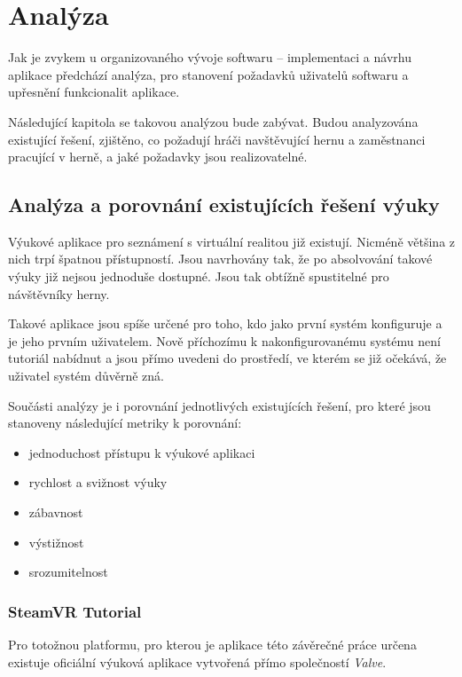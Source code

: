 \section{Analýza}\label{analuxfdza}

Jak je zvykem u organizovaného vývoje softwaru -- implementaci a návrhu
aplikace předchází analýza, pro stanovení požadavků uživatelů softwaru a
upřesnění funkcionalit aplikace.

Následující kapitola se takovou analýzou bude zabývat. Budou analyzována
existující řešení, zjištěno, co požadují hráči navštěvující hernu a
zaměstnanci pracující v herně, a jaké požadavky jsou realizovatelné.

\subsection{Analýza a porovnání existujících řešení
výuky}\label{analuxfdza-a-porovnuxe1nuxed-existujuxedcuxedch-ux159eux161enuxed-vuxfduky}

Výukové aplikace pro seznámení s virtuální realitou již existují.
Nicméně většina z nich trpí špatnou přístupností. Jsou navrhovány tak,
že po absolvování takové výuky již nejsou jednoduše dostupné. Jsou tak
obtížně spustitelné pro návštěvníky herny.

Takové aplikace jsou spíše určené pro toho, kdo jako první systém
konfiguruje a je jeho prvním uživatelem. Nově příchozímu k
nakonfigurovanému systému není tutoriál nabídnut a jsou přímo uvedeni do
prostředí, ve kterém se již očekává, že uživatel systém důvěrně zná.

Součásti analýzy je i porovnání jednotlivých existujících řešení, pro
které jsou stanoveny následující metriky k porovnání:

\begin{itemize}
\tightlist
\item
  jednoduchost přístupu k výukové aplikaci
\item
  rychlost a svižnost výuky
\item
  zábavnost
\item
  výstižnost
\item
  srozumitelnost
\end{itemize}

\subsubsection{SteamVR Tutorial}\label{steamvr-tutorial}

Pro totožnou platformu, pro kterou je aplikace této závěrečné práce
určena existuje oficiální výuková aplikace vytvořená přímo společností
\emph{Valve}.

